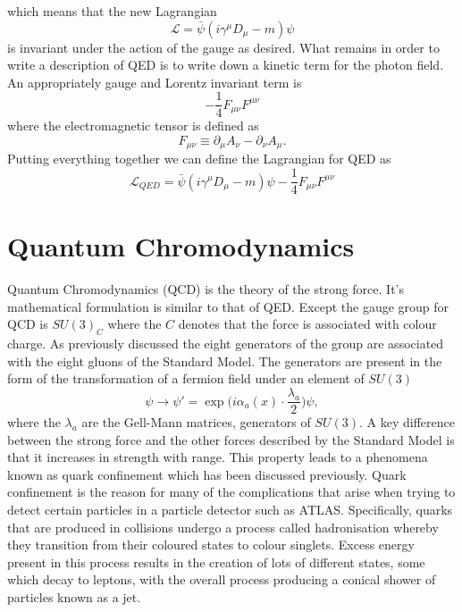 which means that the new Lagrangian
\begin{equation}
  \label{eq:dirac-cov}
  \mathcal{L} = \bar{\psi}(i\gamma^{\mu}D_{\mu} - m)\psi
\end{equation}
is invariant under the action of the gauge as desired. What remains in order to
write a description of QED is to write down a kinetic term for the photon field.
An appropriately gauge and Lorentz invariant term is
\begin{equation}
  \label{eq:em-kinetic}
  -\frac{1}{4}F_{\mu\nu}F^{\mu\nu}
\end{equation}
where the electromagnetic tensor is defined as
\begin{equation}
  \label{eq:em-tensor}
  F_{\mu\nu} \equiv \partial_{\mu}A_{\nu} - \partial_{\nu}A_{\mu}.
\end{equation}
Putting everything together we can define the Lagrangian for QED as
\begin{equation}
  \label{eq:qed}
  \mathcal{L}_{QED} =
  \bar{\psi}(i\gamma^{\mu}D_{\mu} - m)\psi -\frac{1}{4}F_{\mu\nu}F^{\mu\nu} 
\end{equation}

\section{Quantum Chromodynamics}

Quantum Chromodynamics (QCD) is the theory of the strong force. It's mathematical
formulation is similar to that of QED. Except the gauge group for QCD is
$SU(3)_C$ where the $C$ denotes that the force is associated with colour charge.
As previously discussed the eight generators of the group are associated with
the eight gluons of the Standard Model. The generators are present in the form
of the transformation of a fermion field under an element of $SU(3)$
\begin{equation}
  \label{eq:su3-trans}
  \psi \rightarrow \psi' =
  \exp\Big({i\alpha_{a}(x)\cdot\frac{\lambda_{a}}{2}}\Big)\psi,
\end{equation}
where the $\lambda_a$ are the Gell-Mann matrices, generators of $SU(3)$.
A key difference between the strong force and the other forces described by
the Standard Model is that it increases in strength with range. This property
leads to a phenomena known as quark confinement which has been discussed
previously. Quark confinement is the reason for many of the complications that
arise when trying to detect certain particles in a particle detector such as
ATLAS. Specifically, quarks that are produced in collisions undergo a process
called hadronisation whereby they transition from their coloured states to
colour singlets. Excess energy present in this process results in the creation
of lots of different states, some which decay to leptons, with the overall
process producing a conical shower of particles known as a jet.

